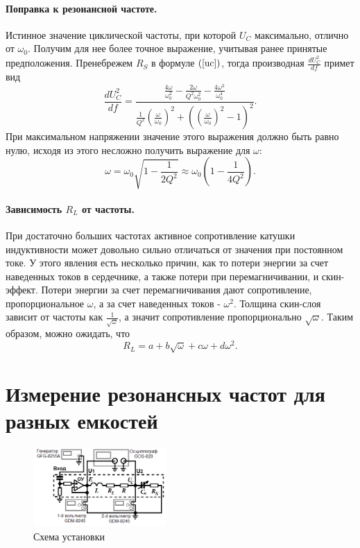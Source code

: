 \documentclass[12pt,a4paper]{article}
\begin{document}
\paragraph{Поправка к резонансной частоте.} Истинное значение циклической частоты, при которой $U_C$ максимально, отлично от $\omega_0$. Получим для нее более точное выражение, учитывая ранее принятые предположения. Пренебрежем $R_S$ в формуле $(\ref{uc})$, тогда производная $\frac{dU^2_C}{df}$ примет вид
\begin{equation}
\frac{dU^2_C}{df}=\frac{\frac{4\omega}{\omega^2_0}-\frac{2\omega}{Q^2\omega_0^2}-\frac{4\omega^3}{\omega^4_0}}{\frac{1}{Q^2}\left(\frac{\omega}{\omega_0}\right)^2 + \left(\left(\frac{\omega}{\omega_0}\right)^2-1\right)^2}.
\end{equation}
При максимальном напряжении значение этого выражения должно быть равно нулю, исходя из этого несложно получить выражение для $\omega$:
\begin{equation}
\omega = \omega_0\sqrt{1-\frac{1}{2Q^2}}\approx\omega_0\left(1-\frac{1}{4Q^2}\right)\label{omp}.
\end{equation}
\paragraph{Зависимость $R_L$ от частоты.} При достаточно больших частотах активное сопротивление катушки индуктивности может довольно сильно отличаться от значения при постоянном токе. У этого явления есть несколько причин, как то потери энергии за счет наведенных токов в сердечнике, а также потери при перемагничивании, и скин-эффект. Потери энергии за счет перемагничивания дают сопротивление, пропорциональное $\omega$, а за счет наведенных токов - $\omega^2$. Толщина скин-слоя зависит от частоты как $\frac{1}{\sqrt{\omega}}$, а значит сопротивление пропорционально $\sqrt{\omega}$. Таким образом, можно ожидать, что
\begin{equation}
R_L = a + b\sqrt{\omega} + c\omega + d\omega^2\label{rl}.
\end{equation}
\section{Измерение резонансных частот для разных емкостей}
\begin{figure}
\centering\includegraphics[width = 0.45\textwidth]{Pct2}
\captionsetup{justification = centering}
\caption{Схема установки\label{Fig2}}
\end{figure}
\end{document}

